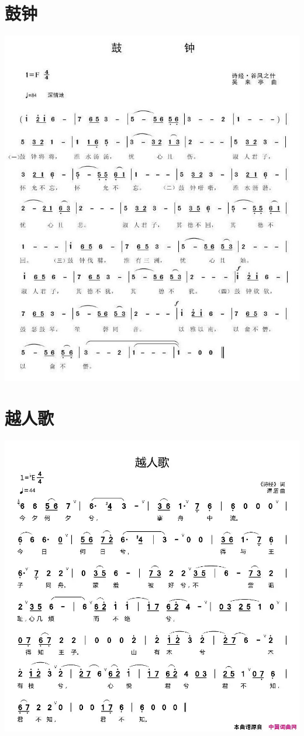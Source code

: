 \documentclass[cn,pad,twocol]{elegantbook}
\begin{document}
\section{鼓钟}      \includegraphics[width=\textwidth]{rpi400/20210123-鼓钟.jpg}
\section{越人歌}    \includegraphics[width=\textwidth]{rpi400/20210123-越人歌.jpg}
\end{document}
